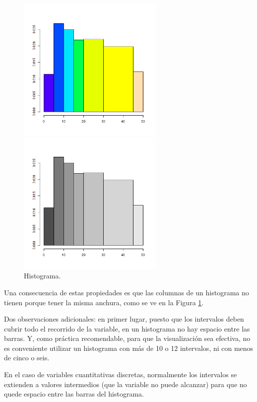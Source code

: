 \begin{figure}[h]
\centering
\begin{enColor}
\includegraphics[height=7cm]{../fig/Cap01-Histograma.png}
\end{enColor}
\begin{bn}
\includegraphics[height=7cm]{../fig/Cap01-Histograma-bn.png}
\end{bn}
\caption{Histograma.}
\label{cap01:fig:Histograma}
\end{figure}

Una consecuencia de estas propiedades es que las columnas de un histograma no tienen porque tener la misma anchura, como se ve en la Figura
\ref{cap01:fig:Histograma}.

Dos observaciones adicionales: en primer lugar, puesto que los
intervalos deben cubrir todo el recorrido de la variable, en un histograma no
hay espacio entre las barras. Y, como práctica recomendable, para que la
visualización sea efectiva, no es conveniente utilizar un histograma con más de
10 o 12 intervalos, ni con menos de cinco o seis.

En el caso de {\sf variables cuantitativas discretas}, normalmente los
intervalos se extienden a valores intermedios (que la variable no puede
alcanzar) para que no quede espacio entre las barras del histograma.

